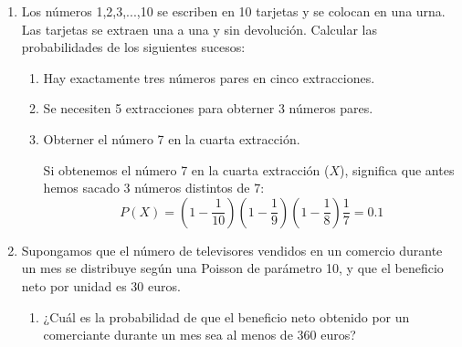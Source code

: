 \documentclass[11pt]{article}
\begin{document}
\begin{enumerate}
\begin{enumerate}
\end{enumerate}

\item Los números 1,2,3,...,10 se escriben en 10 tarjetas y se colocan en una urna. Las tarjetas se extraen una a una y sin devolución. Calcular las probabilidades de los siguientes sucesos:

\begin{enumerate}
\item Hay exactamente tres números pares en cinco extracciones.


\item Se necesiten 5 extracciones para obterner 3 números pares.

\item Obterner el número 7 en la cuarta extracción.

Si obtenemos el número 7 en la cuarta extracción ($X$), significa que antes hemos sacado 3 números distintos de 7: 
\[
P(X)=(1-\frac{1}{10})(1-\frac{1}{9})(1-\frac{1}{8})\frac{1}{7} = 0.1
\]
\end{enumerate}

\item Supongamos que el número de televisores vendidos en un comercio durante un mes se distribuye según una Poisson de parámetro 10, y que el beneficio neto por unidad es 30 euros.
\begin{enumerate}
\item ¿Cuál es la probabilidad de que el beneficio neto obtenido por un comerciante durante un mes sea al menos de 360 euros?
\end{enumerate}

\end{enumerate}
\end{document}
